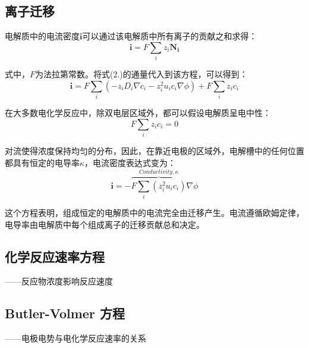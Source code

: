 \subsection{离子迁移}
电解质中的电流密度$\mathbf{i}$可以通过该电解质中所有离子的贡献之和求得：
\begin{equation}
    \mathbf{i}=F\sum_i{z_i\mathbf{N_i}}
\end{equation}

式中，$F$为法拉第常数。将式(2.)的通量代入到该方程，可以得到：
\begin{equation}
    \mathbf{i}=F\sum_i(-z_iD_i\nabla{c_i}-z_i^2u_ic_i\nabla\phi)+F\sum_iz_ic_i
\end{equation}

在大多数电化学反应中，除双电层区域外，都可以假设电解质呈电中性：
\begin{equation}
    F\sum_iz_ic_i=0
\end{equation}

对流使得浓度保持均匀的分布，因此，在靠近电极的区域外，电解槽中的任何位置都具有恒定的电导率$\kappa$，电流密度表达式变为：
\begin{equation}
    \mathbf{i}=-\overbrace{F\sum_i(z_i^2u_ic_i)}^{Conductivity,\kappa}\nabla\phi
\end{equation}

这个方程表明，组成恒定的电解质中的电流完全由迁移产生。电流遵循欧姆定律，电导率由电解质中每个组成离子的迁移贡献总和决定。\cite{Smedley1980}
\subsection{化学反应速率方程}
——反应物浓度影响反应速度
\subsection{Butler-Volmer 方程}
——电极电势与电化学反应速率的关系

